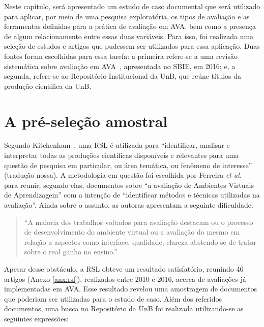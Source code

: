 \label{chap:insp}

Neste capítulo, será apresentado um estudo de caso documental que será utilizado para aplicar, por meio de uma pesquisa exploratória, os tipos de avaliação e as ferramentas definidas para a prática de avaliação em AVA, bem como a presença de algum relacionamento entre essas duas variáveis. Para isso, foi realizada uma seleção de estudos e artigos que pudessem ser utilizados para essa aplicação. Duas fontes foram escolhidas para essa tarefa: a primeira refere-se a uma revisão sistemática sobre avaliação em AVA~\cite{Ferreira@2016}, apresentada no \acrfull{SBIE}, em 2016; e, a segunda, refere-se ao Repositório Institucional da UnB, que reúne títulos da produção científica da \acrfull{UnB}. 

\section{A pré-seleção amostral}%

Segundo Kitchenham~\cite{kitchenham@2007}, uma \acrfull{RSL} é utilizada para ``identificar, analisar e interpretar todas as produções científicas disponíveis e relevantes para uma questão de pesquisa em particular, ou área temática, ou fenômeno de interesse'' (tradução nossa). A metodologia em questão foi escolhida por Ferreira \emph{et al.}~\cite{Ferreira@2016} para reunir, segundo elas, documentos sobre ``a avaliação de Ambientes Virtuais de Aprendizagem'' com a intenção de ``identificar métodos e técnicas utilizadas na avaliação''. Ainda sobre o assunto, as autoras apresentam a seguinte dificuldade:

\begin{quote}
``A maioria dos trabalhos voltados para avaliação destacam ou o processo de desenvolvimento do ambiente virtual ou a avaliação do mesmo em relação a aspectos como interface, qualidade, clareza abstendo-se de tratar sobre o real ganho no ensino.''~\cite{Ferreira@2016}    
\end{quote}

Apesar desse obstáculo, a RSL obteve um resultado satisfatório, reunindo 46 artigos (Anexo \ref{anx:rsl}), realizados entre 2010 e 2016, acerca de avaliações já implementadas em AVA. Esse resultado revelou uma amostragem de documentos que poderiam ser utilizadas para o estudo de caso. Além dos referidos documentos, uma busca no Repositório da UnB foi realizada utilizando-se as seguintes expressões:

